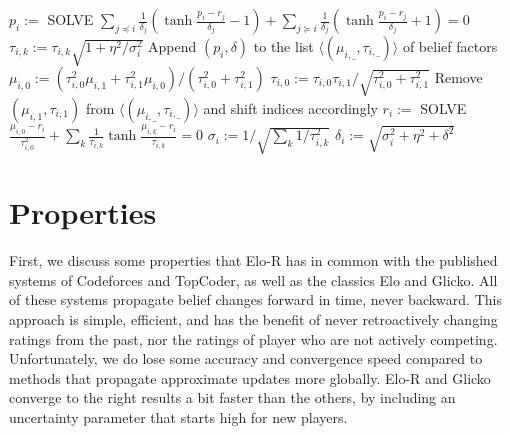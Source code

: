 \documentclass{article}
\begin{document}
\begin{algorithm}
\caption{$update()$}
\label{alg:update}
\begin{algorithmic}
\STATE $p_i := $ SOLVE $\sum_{j\preceq i}\frac{1}{\delta_j}\left( \tanh\frac {p_i - r_j} {\delta_j} - 1 \right) + \sum_{j\succeq i}\frac{1}{\delta_j}\left( \tanh\frac {p_i - r_j} {\delta_j} + 1 \right) = 0$
\ENDFOR
{}
\STATE $\tau_{i,k} := \tau_{i,k} \sqrt{1 + \eta^2/\sigma_i^2}$
\ENDFOR
\STATE Append $(p_i, \delta)$ to the list $\langle( \mu_{i,\_},\tau_{i,\_} )\rangle$ of belief factors
\STATE $\mu_{i,0} := \left( \tau_{i,0}^2 \mu_{i,1} + \tau_{i,1}^2 \mu_{i,0} \right) / \left( \tau_{i,0}^2 + \tau_{i,1}^2 \right)$
\STATE $\tau_{i,0} := \tau_{i,0}\tau_{i,1} / \sqrt{ \tau_{i,0}^2 + \tau_{i,1}^2 }$
\STATE Remove $(\mu_{i,1},\tau_{i,1})$ from $\langle( \mu_{i,\_},\tau_{i,\_} )\rangle$ and shift indices accordingly
\ENDIF
\STATE $r_i := $ SOLVE $\frac{\mu_{i,0}-r_i}{\tau_{i,0}^2} + \sum_k \frac{1}{\tau_{i,k}} \tanh \frac {\mu_{i,k}-r_i} {\tau_{i,k}} = 0$
\STATE $\sigma_i := 1 / \sqrt{\sum_k 1/\tau_{i,k}^2}$
\STATE $\delta_i := \sqrt{\sigma_i^2 + \eta^2 + \delta^2}$
\ENDFOR
\end{algorithmic}
\end{algorithm}

\section{Properties}

First, we discuss some properties that Elo-R has in common with the published systems of Codeforces and TopCoder, as well as the classics Elo and Glicko. All of these systems propagate belief changes forward in time, never backward. This approach is simple, efficient, and has the benefit of never retroactively changing ratings from the past, nor the ratings of player who are not actively competing. Unfortunately, we do lose some accuracy and convergence speed compared to methods that propagate approximate updates more globally. Elo-R and Glicko converge to the right results a bit faster than the others, by including an uncertainty parameter that starts high for new players.
\end{document}
